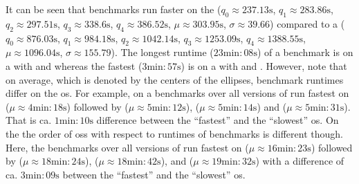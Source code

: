 It can be seen that benchmarks run faster on the 
($q_{0} \approx 237.13\unit{\second}$,
$q_{1} \approx 283.86\unit{\second}$,
$q_{2} \approx 297.51\unit{\second}$,
$q_{3} \approx 338.6\unit{\second}$,
$q_{4} \approx 386.52\unit{\second}$,
$\mu \approx 303.95\unit{\second}$,
$\sigma \approx39.66$)
compared to a 
($q_{0} \approx 876.03\unit{\second}$,
$q_{1} \approx 984.18\unit{\second}$,
$q_{2} \approx 1042.14\unit{\second}$,
$q_{3} \approx 1253.09\unit{\second}$,
$q_{4} \approx 1388.55\unit{\second}$,
$\mu \approx 1096.04\unit{\second}$,
$\sigma \approx 155.79$).
The longest runtime ($23\unit{\minute}:08\unit{\second}$) of a benchmark is on a  with  and  whereas the fastest ($3\unit{\minute}:57\unit{\second}$) is on a  with  and .
However, note that on average, which is denoted by the centers of the ellipses, benchmark runtimes differ on the \gls{os}.
For example, on a  benchmarks over all versions of \python run fastest on  ($\mu \approx 4\unit{\minute}:18\unit{\second}$) followed by  ($\mu \approx 5\unit{\minute}:12\unit{\second}$),  ($\mu \approx 5\unit{\minute}:14\unit{\second}$) and  ($\mu \approx 5\unit{\minute}:31\unit{\second}$).
That is ca. $1\unit{\minute}:10\unit{\second}$ difference between the ``fastest'' and the ``slowest'' \gls{os}.
On the  the order of \glspl{os} with respect to runtimes of benchmarks is different though.
Here, the benchmarks over all versions of \python run fastest on  ($\mu \approx 16\unit{\minute}:23\unit{\second}$) followed by  ($\mu \approx 18\unit{\minute}:24\unit{\second}$),
 ($\mu \approx 18\unit{\minute}:42\unit{\second}$), and  ($\mu \approx 19\unit{\minute}:32\unit{\second}$) with a difference of ca. $3\unit{\minute}:09\unit{\second}$ between the ``fastest'' and the ``slowest'' \gls{os}.





